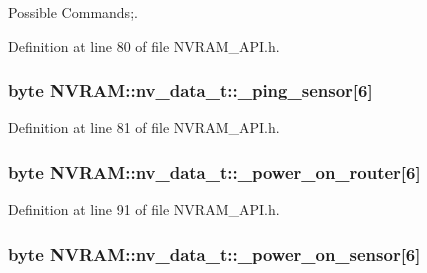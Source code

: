 Possible Commands;. 



Definition at line 80 of file N\-V\-R\-A\-M\-\_\-\-A\-P\-I.\-h.

\hypertarget{struct_n_v_r_a_m_1_1nv__data__t_ab3ad2cdee9bcdc40a3341d74411ae21b}{
\subsubsection[{\-\_\-ping\-\_\-sensor}]{\setlength{\rightskip}{0pt plus 5cm}byte N\-V\-R\-A\-M\-::nv\-\_\-data\-\_\-t\-::\-\_\-ping\-\_\-sensor\mbox{[}6\mbox{]}}}\label{struct_n_v_r_a_m_1_1nv__data__t_ab3ad2cdee9bcdc40a3341d74411ae21b}


Definition at line 81 of file N\-V\-R\-A\-M\-\_\-\-A\-P\-I.\-h.

\hypertarget{struct_n_v_r_a_m_1_1nv__data__t_adec0ad61099811c885cd755376550b54}{
\subsubsection[{\-\_\-power\-\_\-on\-\_\-router}]{\setlength{\rightskip}{0pt plus 5cm}byte N\-V\-R\-A\-M\-::nv\-\_\-data\-\_\-t\-::\-\_\-power\-\_\-on\-\_\-router\mbox{[}6\mbox{]}}}\label{struct_n_v_r_a_m_1_1nv__data__t_adec0ad61099811c885cd755376550b54}


Definition at line 91 of file N\-V\-R\-A\-M\-\_\-\-A\-P\-I.\-h.

\hypertarget{struct_n_v_r_a_m_1_1nv__data__t_abd0e2dba804c48f27d07f76732390ed0}{
\subsubsection[{\-\_\-power\-\_\-on\-\_\-sensor}]{\setlength{\rightskip}{0pt plus 5cm}byte N\-V\-R\-A\-M\-::nv\-\_\-data\-\_\-t\-::\-\_\-power\-\_\-on\-\_\-sensor\mbox{[}6\mbox{]}}}\label{struct_n_v_r_a_m_1_1nv__data__t_abd0e2dba804c48f27d07f76732390ed0}


